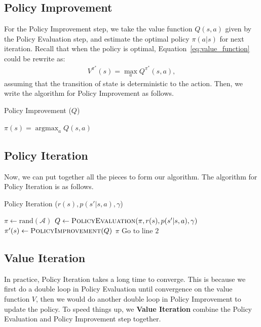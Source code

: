 \documentclass[11pt]{article}
\DeclareMathOperator*{\argmax}{argmax} %
\begin{document}
\subsection{Policy Improvement}

For the Policy Improvement step, we take the value function $Q(s, a)$ given by the Policy Evaluation step, and estimate the optimal policy $\pi(a|s)$ for next iteration. Recall that when the policy is optimal, Equation~\ref{eq:value_function} could be rewrite as:
%
\begin{align*}
V^{\pi^*}(s) = \max_a Q^{\pi^*}(s, a),
\end{align*}
%
assuming that the transition of state is deterministic to the action. Then, we write the algorithm for Policy Improvement as follows.
%
\begin{algorithm}[H]
\caption{Policy Improvement ($Q$)}
\label{algo:policy_improvement}
\begin{algorithmic}[1]
\STATE $\pi(s) = \argmax_a Q(s, a)$
\ENDFOR
\RETURN{$\pi$}
\end{algorithmic}
\end{algorithm}


\subsection{Policy Iteration}

Now, we can put together all the pieces to form our algorithm. The algorithm for Policy Iteration is as follows.
%
\begin{algorithm}[H]
\caption{Policy Iteration ($r(s), p(s'|s, a), \gamma$)}
\label{algo:policy_iteration}
\begin{algorithmic}[1]
\STATE $\pi \leftarrow \text{rand}(\mathcal{A})$
\STATE $Q \leftarrow \textsc{PolicyEvaluation}(\pi, r(s), p(s'|s, a), \gamma)$
\STATE $\pi'(s) \leftarrow \textsc{PolicyImprovement}(Q)$
\RETURN $\pi$
\ENDIF
\STATE $\text{Go to line 2}$
\end{algorithmic}
\end{algorithm}


\subsection{Value Iteration}

In practice, Policy Iteration takes a long time to converge. This is because we first do a double loop in Policy Evaluation until convergence on the value function $V$, then we would do another double loop in Policy Improvement to update the policy. To speed things up, we \textbf{Value Iteration} combine the Policy Evaluation and Policy Improvement step together.
\end{document}
